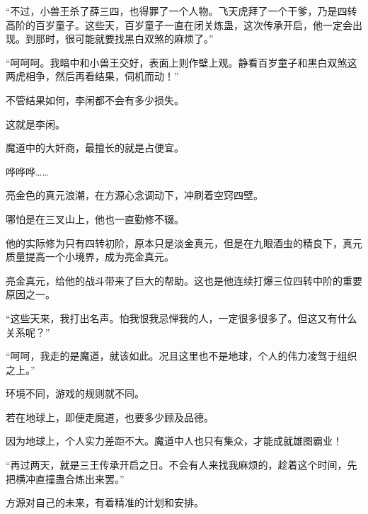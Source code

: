 \begin{this_body}
“不过，小兽王杀了薛三四，也得罪了一个人物。飞天虎拜了一个干爹，乃是四转高阶的百岁童子。这些天，百岁童子一直在闭关炼蛊，这次传承开启，他一定会出现。到那时，很可能就要找黑白双煞的麻烦了。”

“呵呵呵。我暗中和小兽王交好，表面上则作壁上观。静看百岁童子和黑白双煞这两虎相争，然后再看结果，伺机而动！”

不管结果如何，李闲都不会有多少损失。

这就是李闲。

魔道中的大奸商，最擅长的就是占便宜。

哗哗哗……

亮金色的真元浪潮，在方源心念调动下，冲刷着空窍四壁。

哪怕是在三叉山上，他也一直勤修不辍。

他的实际修为只有四转初阶，原本只是淡金真元，但是在九眼酒虫的精良下，真元质量提高一个小境界，成为亮金真元。

亮金真元，给他的战斗带来了巨大的帮助。这也是他连续打爆三位四转中阶的重要原因之一。

“这些天来，我打出名声。怕我恨我忌惮我的人，一定很多很多了。但这又有什么关系呢？”

“呵呵，我走的是魔道，就该如此。况且这里也不是地球，个人的伟力凌驾于组织之上。”

环境不同，游戏的规则就不同。

若在地球上，即便走魔道，也要多少顾及品德。

因为地球上，个人实力差距不大。魔道中人也只有集众，才能成就雄图霸业！

“再过两天，就是三王传承开启之日。不会有人来找我麻烦的，趁着这个时间，先把横冲直撞蛊合炼出来罢。”

方源对自己的未来，有着精准的计划和安排。

\end{this_body}

